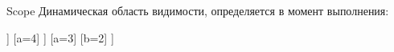 \begin{frame}[t]{Scope}
Динамическая область видимости, определяется в момент выполнения:

\begin{forest}
[ScopeRoot
	[ScopeNonLocal
		[ScopeLocal
			[b=3]
		]
		[a=4]
	]
	[a=3]
	[b=2]
]
\end{forest}
\end{frame}
